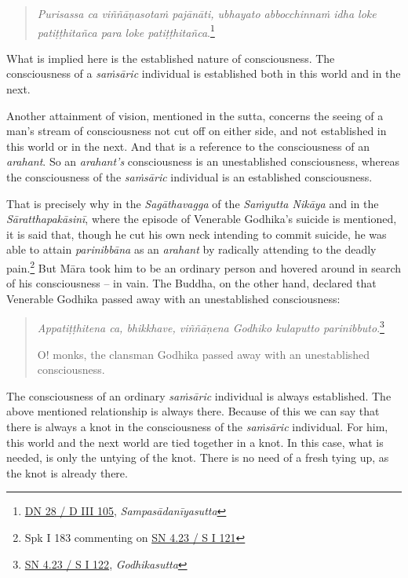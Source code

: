 \begin{quote}
\emph{Purisassa ca viññāṇasotaṁ pajānāti, ubhayato abbocchinnaṁ idha loke patiṭṭhitañca para loke patiṭṭhitañca}.\footnote{\href{https://suttacentral.net/dn28/pli/ms}{DN 28 / D III 105}, \emph{Sampasādanīyasutta}}
\end{quote}

What is implied here is the established nature of consciousness. The consciousness of a \emph{saṁsāric} individual is established both in this world and in the next.

Another attainment of vision, mentioned in the sutta, concerns the seeing of a man's stream of consciousness not cut off on either side, and not established in this world or in the next. And that is a reference to the consciousness of an \emph{arahant}. So an \emph{arahant's} consciousness is an unestablished consciousness, whereas the consciousness of the \emph{saṁsāric} individual is an established consciousness.

That is precisely why in the \emph{Sagāthavagga} of the \emph{Saṁyutta Nikāya} and in the \emph{Sāratthapakāsinī}, where the episode of Venerable Godhika's suicide is mentioned, it is said that, though he cut his own neck intending to commit suicide, he was able to attain \emph{parinibbāna} as an \emph{arahant} by radically attending to the deadly pain.\footnote{Spk I 183 commenting on \href{https://suttacentral.net/sn4.23/pli/ms}{SN 4.23 / S I 121}} But Māra took him to be an ordinary person and hovered around in search of his consciousness -- in vain. The Buddha, on the other hand, declared that Venerable Godhika passed away with an unestablished consciousness:

\begin{quote}
\emph{Appatiṭṭhitena ca, bhikkhave, viññāṇena Godhiko kulaputto parinibbuto}.\footnote{\href{https://suttacentral.net/sn4.23/pli/ms}{SN 4.23 / S I 122}, \emph{Godhikasutta}}

O! monks, the clansman Godhika passed away with an unestablished consciousness.
\end{quote}

The consciousness of an ordinary \emph{saṁsāric} individual is always established. The above mentioned relationship is always there. Because of this we can say that there is always a knot in the consciousness of the \emph{saṁsāric} individual. For him, this world and the next world are tied together in a knot. In this case, what is needed, is only the untying of the knot. There is no need of a fresh tying up, as the knot is already there.

